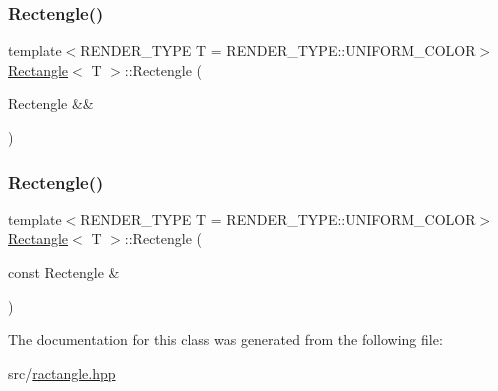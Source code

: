 \mbox{\label{classRectangle_aae13f4d97815a0226a06befa16719094}} 
\subsubsection{\texorpdfstring{Rectengle()}{Rectengle()}\hspace{0.1cm}{\footnotesize\ttfamily [2/3]}}
{\footnotesize\ttfamily template$<$R\+E\+N\+D\+E\+R\+\_\+\+T\+Y\+PE T = R\+E\+N\+D\+E\+R\+\_\+\+T\+Y\+P\+E\+::\+U\+N\+I\+F\+O\+R\+M\+\_\+\+C\+O\+L\+OR$>$ \\
\mbox{\hyperlink{classRectangle}{Rectangle}}$<$ T $>$\+::Rectengle (\begin{DoxyParamCaption}\item[{Rectengle \&\&}]{ }\end{DoxyParamCaption})\hspace{0.3cm}{\ttfamily [default]}}

\mbox{\label{classRectangle_a5937069e17ab47587f0104a1ce2e493b}} 
\subsubsection{\texorpdfstring{Rectengle()}{Rectengle()}\hspace{0.1cm}{\footnotesize\ttfamily [3/3]}}
{\footnotesize\ttfamily template$<$R\+E\+N\+D\+E\+R\+\_\+\+T\+Y\+PE T = R\+E\+N\+D\+E\+R\+\_\+\+T\+Y\+P\+E\+::\+U\+N\+I\+F\+O\+R\+M\+\_\+\+C\+O\+L\+OR$>$ \\
\mbox{\hyperlink{classRectangle}{Rectangle}}$<$ T $>$\+::Rectengle (\begin{DoxyParamCaption}\item[{const Rectengle \&}]{ }\end{DoxyParamCaption})\hspace{0.3cm}{\ttfamily [default]}}



The documentation for this class was generated from the following file\+:\begin{DoxyCompactItemize}
\item 
src/\mbox{\hyperlink{ractangle_8hpp}{ractangle.\+hpp}}\end{DoxyCompactItemize}
